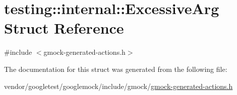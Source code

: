\hypertarget{structtesting_1_1internal_1_1ExcessiveArg}{}\section{testing\+:\+:internal\+:\+:Excessive\+Arg Struct Reference}
\label{structtesting_1_1internal_1_1ExcessiveArg}


{\ttfamily \#include $<$gmock-\/generated-\/actions.\+h$>$}



The documentation for this struct was generated from the following file\+:\begin{DoxyCompactItemize}
\item 
vendor/googletest/googlemock/include/gmock/\hyperlink{gmock-generated-actions_8h}{gmock-\/generated-\/actions.\+h}\end{DoxyCompactItemize}
